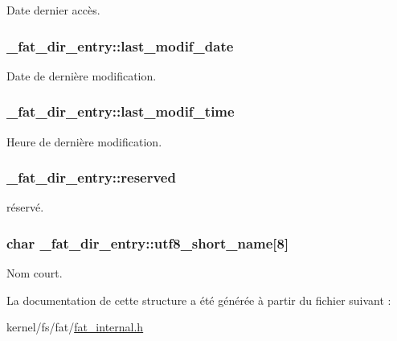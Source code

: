 \-Date dernier accès. \hypertarget{struct__fat__dir__entry_a9be27b92458730fbdf5342f717aadc32}{
\subsubsection[{last\-\_\-modif\-\_\-date}]{ {\bf \-\_\-fat\-\_\-dir\-\_\-entry\-::last\-\_\-modif\-\_\-date}}}\label{struct__fat__dir__entry_a9be27b92458730fbdf5342f717aadc32}
\-Date de dernière modification. \hypertarget{struct__fat__dir__entry_a967f3fe06020a24a22bc83cb80637669}{
\subsubsection[{last\-\_\-modif\-\_\-time}]{ {\bf \-\_\-fat\-\_\-dir\-\_\-entry\-::last\-\_\-modif\-\_\-time}}}\label{struct__fat__dir__entry_a967f3fe06020a24a22bc83cb80637669}
\-Heure de dernière modification. \hypertarget{struct__fat__dir__entry_a27e7962cefa12233338034dff3d75304}{
\subsubsection[{reserved}]{ {\bf \-\_\-fat\-\_\-dir\-\_\-entry\-::reserved}}}\label{struct__fat__dir__entry_a27e7962cefa12233338034dff3d75304}
réservé. \hypertarget{struct__fat__dir__entry_abb18201b12e6039275e6dad91c19a99d}{
\subsubsection[{utf8\-\_\-short\-\_\-name}]{\setlength{\rightskip}{0pt plus 5cm}char {\bf \-\_\-fat\-\_\-dir\-\_\-entry\-::utf8\-\_\-short\-\_\-name}\mbox{[}8\mbox{]}}}\label{struct__fat__dir__entry_abb18201b12e6039275e6dad91c19a99d}
\-Nom court. 

\-La documentation de cette structure a été générée à partir du fichier suivant \-:\begin{DoxyCompactItemize}
\item 
kernel/fs/fat/\hyperlink{fat__internal_8h}{fat\-\_\-internal.\-h}\end{DoxyCompactItemize}
